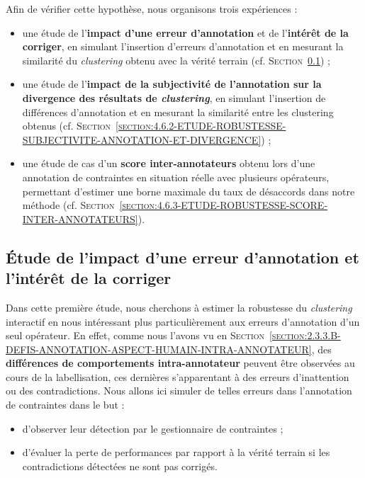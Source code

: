 	
	Afin de vérifier cette hypothèse, nous organisons trois expériences :
	\begin{itemize}
		\item une étude de l'\textbf{impact d'une erreur d'annotation} et de l'\textbf{intérêt de la corriger}, en simulant l'insertion d'erreurs d'annotation et en mesurant la similarité du \textit{clustering} obtenu avec la vérité terrain (cf. \textsc{Section~\ref{section:4.6.1-ETUDE-ROBUSTESSE-ERREURS-ANNOTATION-ET-CORRECTION}}) ;
		\item une étude de l'\textbf{impact de la subjectivité de l'annotation sur la divergence des résultats de \textit{clustering}}, en simulant l'insertion de différences d'annotation et en mesurant la similarité entre les clustering obtenus (cf. \textsc{Section~\ref{section:4.6.2-ETUDE-ROBUSTESSE-SUBJECTIVITE-ANNOTATION-ET-DIVERGENCE}}) ;
		\item une étude de cas d'un \textbf{score inter-annotateurs} obtenu lors d'une annotation de contraintes en situation réelle avec plusieurs opérateurs, permettant d'estimer une borne maximale du taux de désaccords dans notre méthode (cf. \textsc{Section~\ref{section:4.6.3-ETUDE-ROBUSTESSE-SCORE-INTER-ANNOTATEURS}}).
	\end{itemize}
	
	
	\subsection{Étude de l'impact d'une erreur d'annotation et l'intérêt de la corriger}
	\label{section:4.6.1-ETUDE-ROBUSTESSE-ERREURS-ANNOTATION-ET-CORRECTION}
		
		Dans cette première étude, nous cherchons à estimer la robustesse du \textit{clustering} interactif en nous intéressant plus particulièrement aux erreurs d'annotation d'un seul opérateur.
		En effet, comme nous l'avons vu en \textsc{Section~\ref{section:2.3.3.B-DEFIS-ANNOTATION-ASPECT-HUMAIN-INTRA-ANNOTATEUR}}, des \textbf{différences de comportements intra-annotateur} peuvent être observées au cours de la labellisation, ces dernières s'apparentant à des erreurs d'inattention ou des contradictions.
		Nous allons ici simuler de telles erreurs dans l'annotation de contraintes dans le but :
		\begin{itemize}
			\item d'observer leur détection par le gestionnaire de contraintes ;
			\item d'évaluer la perte de performances par rapport à la vérité terrain si les contradictions détectées ne sont pas corrigés.
		\end{itemize}
	

